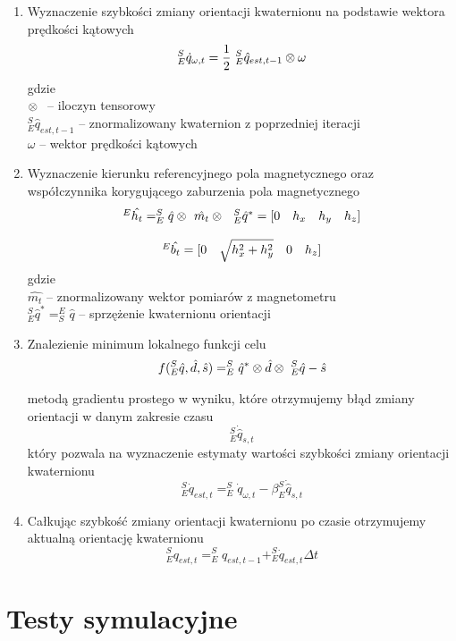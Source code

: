 \begin{enumerate}
    \item Wyznaczenie szybkości zmiany orientacji kwaternionu na podstawie wektora prędkości kątowych
    $$
        _E^S \Dot{q}_{\omega,t} = \frac{1}{2} \ _E^S \hat{q}_{est,t-1} \tens \ \omega
    $$
    gdzie \\
    $ \mathbin{\mathop{\otimes}\displaylimits_{\ }}$ -- iloczyn tensorowy \\
    $ _E^S \hat{q}_{est,t-1} $ -- znormalizowany kwaternion z poprzedniej iteracji\\
    $ \omega $ -- wektor prędkości kątowych
    \item Wyznaczenie kierunku referencyjnego pola magnetycznego oraz współczynnika korygującego zaburzenia pola magnetycznego
    $$
        \begin{array}{cc}
            ^E \hat{h_t} = _E^S \hat{q} \mathbin{\mathop{\otimes}\displaylimits_{\ }}\hat{m_t} \mathbin{\mathop{\otimes}\displaylimits_{\ }}\ _E^S \hat{q}^{*} = [0 \quad h_x \quad h_y \quad h_z] \\ \\
            ^E \hat{b_t} = [0 \quad \sqrt{h_x^2 + h_y^2} \quad 0 \quad h_z]
        \end{array}
    $$
    gdzie \\
    $ \hat{m_t} $ -- znormalizowany wektor pomiarów z magnetometru\\
    $ _E^S \hat{q}^{*} = _S^E \hat{q} $ -- sprzężenie kwaternionu orientacji
    \item Znalezienie minimum lokalnego funkcji celu
    $$
        f(_E^S \hat{q}, \hat{d}, \hat{s}) = _E^S \hat{q}^{*} \mathbin{\mathop{\otimes}\displaylimits_{\ }}\hat{d} \mathbin{\mathop{\otimes}\displaylimits_{\ }}\ _E^S \hat{q} - \hat{s}
    $$
    metodą gradientu prostego w wyniku, które otrzymujemy błąd zmiany orientacji w danym zakresie czasu
    $$
        _E^S \Dot{\hat{q}}_{s,t}
    $$
    który pozwala na wyznaczenie estymaty wartości szybkości zmiany orientacji kwaternionu
    $$
        _E^S \Dot{q}_{est,t} = _E^S \Dot{q}_{\omega,t} - \beta _E^S \Dot{\hat{q}}_{s,t}
    $$
    \item Całkując szybkość zmiany orientacji kwaternionu po czasie otrzymujemy aktualną orientację kwaternionu 
    $$
        _E^S q_{est,t} = _E^S q_{est,t-1} + _E^S \Dot{q}_{est,t} \Delta t
    $$
    
\end{enumerate}

\section{Testy symulacyjne}

